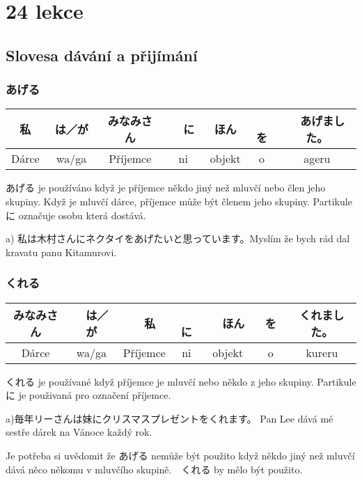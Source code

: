 \section{24 lekce}
\label{sec:lekce_24}

\subsection{Slovesa dávání a přijímání}


\subsubsection{あげる}
\begin{center}
\begin{tabular}{||c|c||c|c||c|c||c||}
\hline
私　&は／が　&みなみさん&　に　&ほん&　を&　あげました。\\
\hline
Dárce&wa/ga&Příjemce&ni&objekt&o&ageru\\
\hline
\end{tabular}
\end{center}


あげる je používáno když je příjemce někdo jiný než mluvčí nebo člen jeho skupiny. Když je mluvčí dárce, příjemce může být členem jeho skupiny. Partikule　に označuje osobu která dostává.

a) 私は木村さんにネクタイをあげたいと思っています。Myslím že bych rád dal kravatu panu Kitamurovi.


\subsubsection{くれる}
\begin{center}
\begin{tabular}{||c|c||c|c||c|c||c||}
\hline
みなみさん&　は／が&　私&　に&　ほん　&を　&くれました。\\
\hline
Dárce&wa/ga&Příjemce&ni&objekt&o&kureru\\
\hline
\end{tabular}
\end{center}

 
くれる je používané když příjemce je mluvčí nebo někdo z jeho skupiny. Partikule　　に je použivaná pro označení příjemce.

a)毎年リーさんは妹にクリスマスプレゼントをくれます。 Pan Lee dává mé sestře dárek na Vánoce každý rok.


Je potřeba si uvědomit že あげる nemůže být použito když někdo jiný než mluvčí dává něco někomu v mluvčího skupině.　くれる by mělo být použito.


